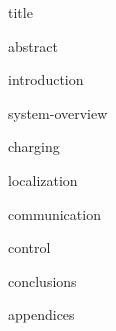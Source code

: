 \documentclass[11pt,titlepage]{report}
\begin{document}
{title}

\clearpage
{abstract}
\tableofcontents
				
\clearpage
{}
{introduction}

{system-overview}

{charging}

{localization}

{communication}

{control}

{conclusions}

\clearpage
{}
\printbibliography[heading=bibintoc]

\clearpage
{appendices}
\end{document}
